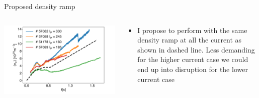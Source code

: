 \documentclass[10pt, compress]{beamer}
\newcommand\Fontvi{\fontsize{8}{7.2}\selectfont}
\begin{document}
\begin{frame}{Proposed density ramp}
\Fontvi
  \begin{columns}
    \begin{column}{0.6\textwidth}
      \includegraphics[width=\textwidth]{../../Experiments/TCV/analysis/pdfbox/ProposedDensityRamp}
    \end{column}
    \begin{column}{0.4\textwidth}
      \begin{itemize}
        \item I propose to perform with the same density ramp at all
          the current as shown in dashed line. Less demanding for the
          higher current case we could end up into disruption for the
          lower current case
      \end{itemize}
    \end{column}
  \end{columns}
  \end{frame}
\end{document}
